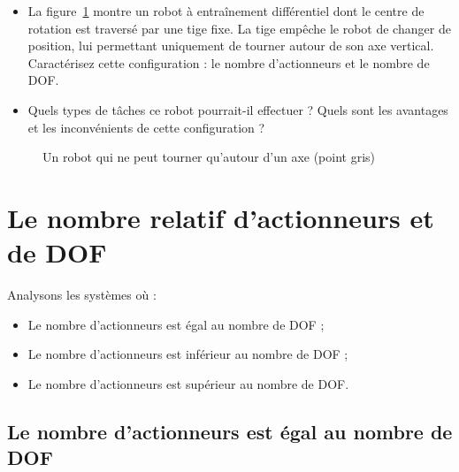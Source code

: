 \begin{framed}
\begin{itemize}
\item La figure~\ref{fig.rot-dof} montre un robot à entraînement différentiel dont le centre de rotation est traversé par une tige fixe. La tige empêche le robot de changer de position, lui permettant uniquement de tourner autour de son axe vertical. Caractérisez cette configuration : le nombre d'actionneurs et le nombre de DOF.
\item Quels types de tâches ce robot pourrait-il effectuer ? Quels sont les avantages et les inconvénients de cette configuration ?
\end{itemize}
\end{framed}

\begin{figure}
\begin{center}
\end{center}
\caption{Un robot qui ne peut tourner qu'autour d'un axe (point gris)}\label{fig.rot-dof}
\end{figure}

\section{Le nombre relatif d'actionneurs et de DOF}\label{s.num-actuators}

Analysons les systèmes où :
\begin{itemize}
\item Le nombre d'actionneurs est égal au nombre de DOF ;
\item Le nombre d'actionneurs est inférieur au nombre de DOF ;
\item Le nombre d'actionneurs est supérieur au nombre de DOF.
\end{itemize}

\subsection*{Le nombre d'actionneurs est égal au nombre de DOF}

